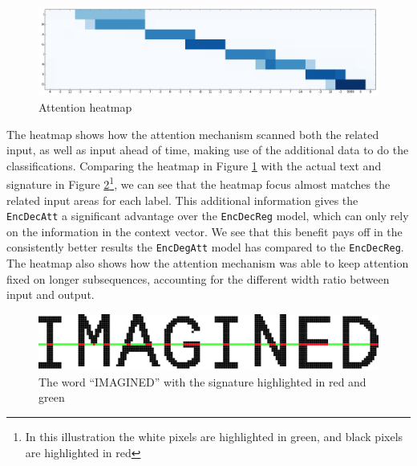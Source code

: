 \begin{figure}[ht]
    \centering
    \includegraphics[width=1\textwidth]{fig/conclusion/attention_crop.png}
    \caption{Attention heatmap}
    \label{fig:attention_heatmap}
\end{figure}

The heatmap shows how the attention mechanism scanned both the related input, as well as input ahead of time, making use of the additional data to do the classifications. Comparing the heatmap in Figure \ref{fig:attention_heatmap} with the actual text and signature in Figure  \ref{fig:imagine_highlighted}\footnote{In this illustration the white pixels are highlighted in green, and black pixels are highlighted in red}, we can see that the heatmap focus almost matches the related input areas for each label. This additional information gives the {\tt EncDecAtt} a significant advantage over the {\tt EncDecReg} model, which can only rely on the information in the context vector. We see that this benefit pays off in the consistently better results the {\tt EncDegAtt} model has compared to the {\tt EncDecReg}. The heatmap also shows how the attention mechanism was able to keep attention fixed on longer subsequences, accounting for the different width ratio between input and output.

\begin{figure}[ht]
    \centering
    \includegraphics[width=1\textwidth]{fig/conclusion/imagined_grid_exported.jpg}
    \caption{The word ``IMAGINED'' with the signature highlighted in red and green}
    \label{fig:imagine_highlighted}
\end{figure}
